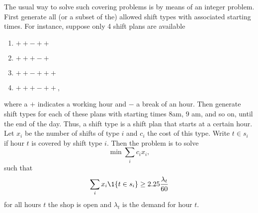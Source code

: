 The usual way to solve such covering problems is by means of an integer
problem. First generate all (or a subset of the) allowed shift types
with associated starting times. For instance, suppose only 4 shift
plans are available
\begin{enumerate}
\item $++-++$
\item $+++-+$
\item $++-+++$
\item $+++-++$,
\end{enumerate}
where a $+$ indicates a working hour and $-$ a break of an hour. Then
generate shift types for each of these plans with starting times
$8$am, $9$ am, and so on, until the end of the day. Thus, a shift type
is a shift plan that starts at a certain hour. Let $x_i$ be the number
of shifts of type $i$ and $c_i$ the cost of this type. Write $t\in s_i$ if
hour $t$ is covered by shift type $i$. Then the problem is to solve
\begin{equation*}
 \min \sum_i c_i x_i,
\end{equation*}
such that 
\begin{equation*}
 \sum_i x_i \1{t \in s_i} \geq 2.25 \frac{\lambda_t}{60}
\end{equation*}
for all hours $t$ the shop is open and $\lambda_t$ is the demand for
hour $t$.








